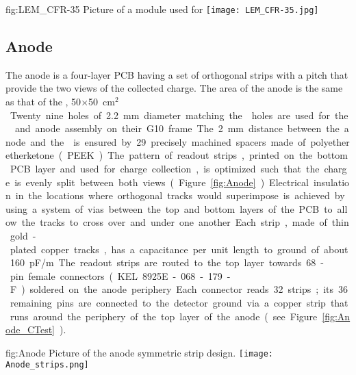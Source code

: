 \begin{dunefigure}
{fig:LEM_CFR-35}
{Picture of a  module used for  }
\texttt{[image: LEM\_CFR-35.jpg]}
\end{dunefigure}

\subsection{Anode}
\label{sec:fddp-crp-anode}
 
The anode is a four-layer PCB having a set of orthogonal strips with a \dpstrippitch pitch that provide the two views of the collected charge. The area of the anode is the same as that of the ,  \num{50}$\times$\SI{50}{cm$^2$}. Twenty nine holes of \SI{2.2}{mm} diameter matching the  holes are used for the  and anode assembly on their G10 frame. The \SI{2}{mm} distance between the anode and the  is ensured by \num{29} precisely machined spacers made of polyetheretherketone (PEEK). 

The pattern of readout strips, printed on the bottom PCB layer and used for charge collection, is optimized such that the charge is evenly split between both views (Figure~\ref{fig:Anode}). Electrical insulation in the locations where orthogonal tracks would superimpose is achieved by 
using a system of vias between the top and bottom layers of the PCB to allow the tracks to cross over and under one another. 
Each strip, made of thin gold-plated copper tracks, has a capacitance per unit length to ground of about 
\SI{160}{pF/m}. The readout strips are routed to the top layer towards \num{68}-pin female connectors (KEL 8925E-068-179-F) soldered on the anode periphery. Each connector reads \num{32} strips; its \num{36} remaining pins are connected to the detector ground via a copper strip that runs around the periphery of the top layer of the anode (see Figure \ref{fig:Anode_CTest}). 

\begin{dunefigure}
{fig:Anode}
{Picture of the anode symmetric \twod strip design.}
  \texttt{[image: Anode\_strips.png]}
\end{dunefigure}

